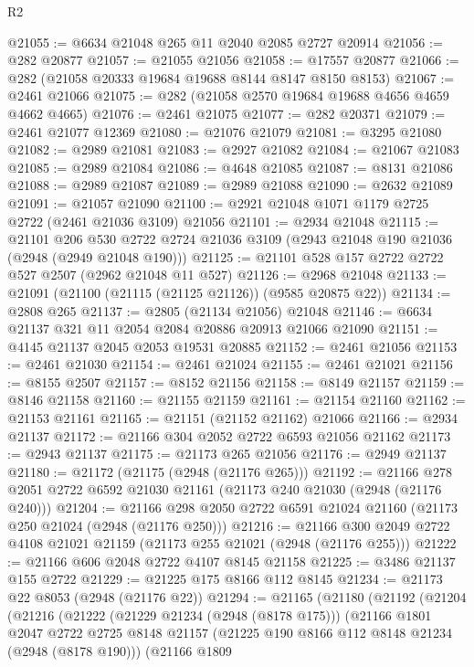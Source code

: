\begin{lexlean}{R2}
\begin{coremodule}
@21055 := @6634 @21048 @265 @11 @2040 @2085 @2727 @20914
@21056 := @282 @20877
@21057 := @21055 @21056
@21058 := @17557 @20877
@21066 := @282 (@21058 @20333 @19684 @19688 @8144 @8147 @8150 @8153)
@21067 := @2461 @21066
@21075 := @282 (@21058 @2570 @19684 @19688 @4656 @4659 @4662 @4665)
@21076 := @2461 @21075
@21077 := @282 @20371
@21079 := @2461 @21077 @12369
@21080 := @21076 @21079
@21081 := @3295 @21080
@21082 := @2989 @21081
@21083 := @2927 @21082
@21084 := @21067 @21083
@21085 := @2989 @21084
@21086 := @4648 @21085
@21087 := @8131 @21086
@21088 := @2989 @21087
@21089 := @2989 @21088
@21090 := @2632 @21089
@21091 := @21057 @21090
@21100 := @2921 @21048 @1071 @1179 @2725 @2722 (@2461 @21036 @3109) @21056
@21101 := @2934 @21048
@21115 := @21101
    @206
    @530
    @2722
    @2724
    @21036
    @3109
    (@2943 @21048 @190 @21036 (@2948 (@2949 @21048 @190)))
@21125 := @21101 @528 @157 @2722 @2722 @527 @2507 (@2962 @21048 @11 @527)
@21126 := @2968 @21048
@21133 := @21091 (@21100 (@21115 (@21125 @21126)) (@9585 @20875 @22))
@21134 := @2808 @265
@21137 := @2805 (@21134 @21056) @21048
@21146 := @6634 @21137 @321 @11 @2054 @2084 @20886 @20913 @21066 @21090
@21151 := @4145 @21137 @2045 @2053 @19531 @20885
@21152 := @2461 @21056
@21153 := @2461 @21030
@21154 := @2461 @21024
@21155 := @2461 @21021
@21156 := @8155 @2507
@21157 := @8152 @21156
@21158 := @8149 @21157
@21159 := @8146 @21158
@21160 := @21155 @21159
@21161 := @21154 @21160
@21162 := @21153 @21161
@21165 := @21151 (@21152 @21162) @21066
@21166 := @2934 @21137
@21172 := @21166 @304 @2052 @2722 @6593 @21056 @21162
@21173 := @2943 @21137
@21175 := @21173 @265 @21056
@21176 := @2949 @21137
@21180 := @21172 (@21175 (@2948 (@21176 @265)))
@21192 := @21166 @278 @2051 @2722 @6592 @21030 @21161 (@21173 @240 @21030 (@2948 (@21176 @240)))
@21204 := @21166 @298 @2050 @2722 @6591 @21024 @21160 (@21173 @250 @21024 (@2948 (@21176 @250)))
@21216 := @21166 @300 @2049 @2722 @4108 @21021 @21159 (@21173 @255 @21021 (@2948 (@21176 @255)))
@21222 := @21166 @606 @2048 @2722 @4107 @8145 @21158
@21225 := @3486 @21137 @155 @2722
@21229 := @21225 @175 @8166 @112 @8145
@21234 := @21173 @22 @8053 (@2948 (@21176 @22))
@21294 := @21165
    (@21180
      (@21192
        (@21204
          (@21216
            (@21222
              (@21229 @21234 (@2948 (@8178 @175)))
              (@21166
                @1801
                @2047
                @2722
                @2725
                @8148
                @21157
                (@21225 @190 @8166 @112 @8148 @21234 (@2948 (@8178 @190)))
                (@21166
                  @1809

\end{coremodule}
\end{lexlean}
